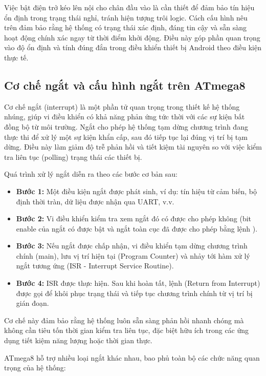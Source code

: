 \documentclass[../DoAn.tex]{subfiles}
\begin{document}
Việc bật điện trở kéo lên nội cho chân đầu vào là cần thiết để đảm bảo tín hiệu ổn định trong trạng thái nghỉ, tránh hiện tượng trôi logic. Cách cấu hình nêu trên đảm bảo rằng hệ thống có trạng thái xác định, đáng tin cậy và sẵn sàng hoạt động chính xác ngay từ thời điểm khởi động. Điều này góp phần quan trọng vào độ ổn định và tính đúng đắn trong điều khiển thiết bị Android theo điều kiện thực tế.

\subsection{Cơ chế ngắt và cấu hình ngắt trên ATmega8}
\label{section:4.3.2}

Cơ chế ngắt (interrupt) là một phần tử quan trọng trong thiết kế hệ thống nhúng, giúp vi điều khiển có khả năng phản ứng tức thời với các sự kiện bất đồng bộ từ môi trường. Ngắt cho phép hệ thống tạm dừng chương trình đang thực thi để xử lý một sự kiện khẩn cấp, sau đó tiếp tục lại đúng vị trí bị tạm dừng. Điều này làm giảm độ trễ phản hồi và tiết kiệm tài nguyên so với việc kiểm tra liên tục (polling) trạng thái các thiết bị.

Quá trình xử lý ngắt diễn ra theo các bước cơ bản sau:

\begin{itemize}
    \item \textbf{Bước 1:} Một điều kiện ngắt được phát sinh, ví dụ: tín hiệu từ cảm biến, bộ định thời tràn, dữ liệu được nhận qua UART, v.v.
    \item \textbf{Bước 2:} Vi điều khiển kiểm tra xem ngắt đó có được cho phép không (bit enable của ngắt có được bật và ngắt toàn cục đã được cho phép bằng lệnh ).
    \item \textbf{Bước 3:} Nếu ngắt được chấp nhận, vi điều khiển tạm dừng chương trình chính (main), lưu vị trí hiện tại (Program Counter) và nhảy tới hàm xử lý ngắt tương ứng (ISR - Interrupt Service Routine).
    \item \textbf{Bước 4:} ISR được thực hiện. Sau khi hoàn tất, lệnh  (Return from Interrupt) được gọi để khôi phục trạng thái và tiếp tục chương trình chính từ vị trí bị gián đoạn.
\end{itemize}

Cơ chế này đảm bảo rằng hệ thống luôn sẵn sàng phản hồi nhanh chóng mà không cần tiêu tốn thời gian kiểm tra liên tục, đặc biệt hữu ích trong các ứng dụng tiết kiệm năng lượng hoặc thời gian thực.

ATmega8 hỗ trợ nhiều loại ngắt khác nhau, bao phủ toàn bộ các chức năng quan trọng của hệ thống:
\end{document}
